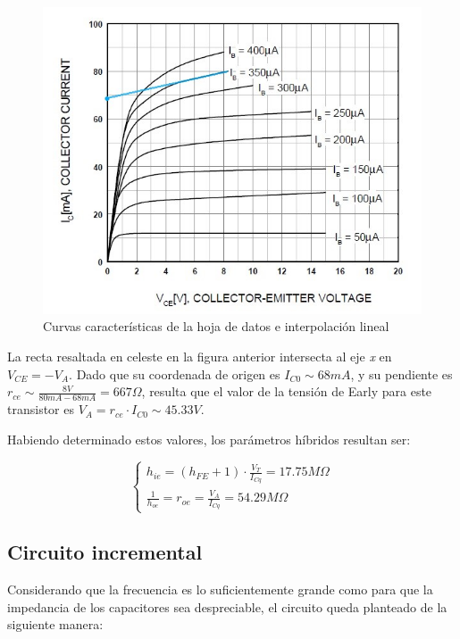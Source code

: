 \documentclass[../../e1_tp1_main.tex]{subfiles}
\begin{document}
\begin{figure} [H]
	\centering
	\includegraphics[scale=0.8]{imagenes/early.jpg}
	\caption{Curvas caracter\'isticas de la hoja de datos e interpolaci\'on lineal}
\end{figure}

La recta resaltada en celeste en la figura anterior intersecta al eje \textit{x} en $V_{CE}=-V_A$. Dado que su coordenada de origen es $I_{C0}\sim 68mA$, y su pendiente es $r_{ce}\sim \frac{8V}{80mA-68mA} = 667\Omega$, resulta que el valor de la tensi\'on de Early para este transistor es $V_A = r_{ce} \cdot I_{C0} \sim 45.33V$.\par

Habiendo determinado estos valores, los par\'ametros h\'ibridos resultan ser:

 \[\left\{
\begin{aligned}
	h_{ie}= (h_{FE}+1) \cdot \frac{V_T}{I_{Cq}} = 17.75M\Omega\\
	\frac{1}{h_{oe}} = r_{oe} = \frac{V_A}{I_{Cq}} = 54.29M\Omega
 \end{aligned}
 \right.\]


\subsection{Circuito incremental}

Considerando que la frecuencia es lo suficientemente grande como para que la impedancia de los capacitores sea despreciable, el circuito queda planteado de la siguiente manera:
\end{document}
